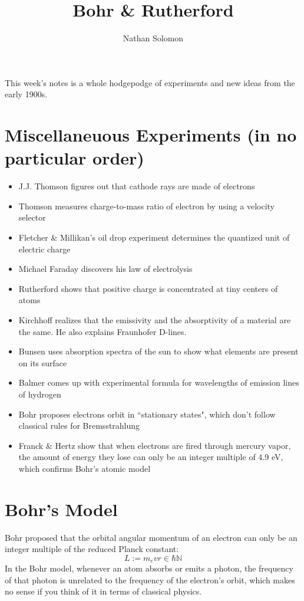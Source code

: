 \documentclass[12pt]{article}
\begin{document}
\title{Bohr \& Rutherford}
\author{Nathan Solomon}
\maketitle

This week's notes is a whole hodgepodge of experiments and new ideas from the early 1900s.

\section{Miscellaneuous Experiments (in no particular order)}
\begin{itemize}
    \item J.J. Thomson figures out that cathode rays are made of electrons
    \item Thomson measures charge-to-mass ratio of electron by using a velocity selector
    \item Fletcher \& Millikan's oil drop experiment determines the quantized unit of electric charge
    \item Michael Faraday discovers his law of electrolysis
    \item Rutherford shows that positive charge is concentrated at tiny centers of atoms
    \item Kirchhoff realizes that the emissivity and the absorptivity of a material are the same. He also explains Fraunhofer D-lines.
    \item Bunsen uses absorption spectra of the sun to show what elements are present on its surface
    \item Balmer comes up with experimental formula for wavelengths of emission lines of hydrogen
    \item Bohr proposes electrons orbit in ``stationary states", which don't follow classical rules for Bremsstrahlung
    \item Franck \& Hertz show that when electrons are fired through mercury vapor, the amount of energy they lose can only be an integer multiple of 4.9 eV, which confirms Bohr's atomic model
\end{itemize}

\section{Bohr's Model}
Bohr proposed that the orbital angular momentum of an electron can only be an integer multiple of the reduced Planck constant:
\[ L := m_e v r \in \hbar \mathbb{N} \]
In the Bohr model, whenever an atom absorbs or emits a photon, the frequency of that photon is unrelated to the frequency of the electron's orbit, which makes no sense if you think of it in terms of classical physics.
\end{document}
